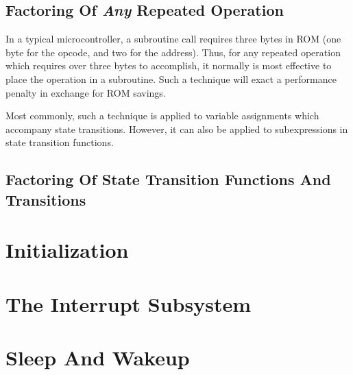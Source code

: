 \subsection{Factoring Of \emph{Any} Repeated Operation}
\label{cpco0:srrs0:sfar0}

In a typical microcontroller, a subroutine call requires three bytes in ROM
(one byte for the opcode, and two for the address).  Thus, for any
repeated operation which requires over three bytes to accomplish,
it normally is most effective to place the operation in a subroutine.
Such a technique will exact a performance penalty in exchange for
ROM savings.

Most commonly, such a technique is applied to variable assignments which
accompany state transitions.  However, it can also be applied
to subexpressions in state transition functions.


\subsection{Factoring Of State Transition Functions And Transitions}
\label{cpco0:srrs0:sfst0}



\section{Initialization}



\section{The Interrupt Subsystem}



\section{Sleep And Wakeup}





